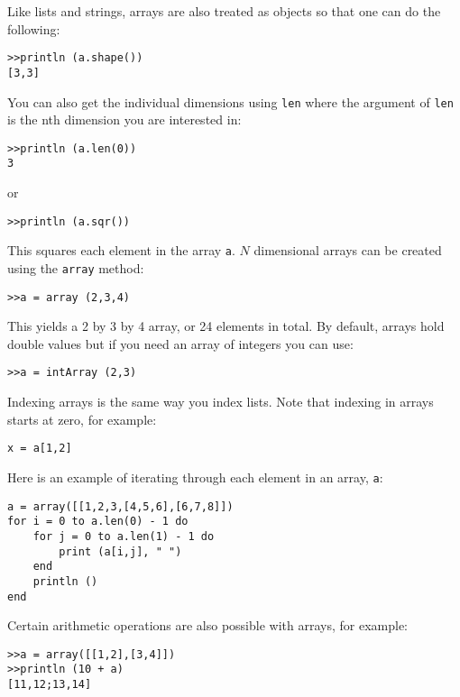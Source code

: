 Like lists and strings, arrays are also treated as objects so that one can do the following:

\begin{lstlisting}
>>println (a.shape())
[3,3]
\end{lstlisting}

You can also get the individual dimensions using {\tt len} where the argument of {\tt len} is the nth dimension you are interested in:

\begin{lstlisting}
>>println (a.len(0))
3
\end{lstlisting}

or

\begin{lstlisting}
>>println (a.sqr())
\end{lstlisting}

This squares each element in the array {\tt a}. $N$ dimensional arrays can be created using the {\tt array} method:

\begin{lstlisting}
>>a = array (2,3,4)
\end{lstlisting}

This yields a 2 by 3 by 4 array, or 24 elements in total. By default, arrays hold double values but if you need an array of integers you can use:

\begin{lstlisting}
>>a = intArray (2,3)
\end{lstlisting}

Indexing arrays is the same way you index lists. Note that indexing in arrays starts at zero, for example:

\begin{lstlisting}
x = a[1,2]
\end{lstlisting}

Here is an example of iterating through each element in an array, {\tt a}:

\begin{lstlisting}
a = array([[1,2,3,[4,5,6],[6,7,8]])
for i = 0 to a.len(0) - 1 do
    for j = 0 to a.len(1) - 1 do
        print (a[i,j], " ")
    end
    println ()
end
\end{lstlisting}

Certain arithmetic operations are also possible with arrays, for example:

\begin{lstlisting}
>>a = array([[1,2],[3,4]])
>>println (10 + a)
[11,12;13,14]
\end{lstlisting}

